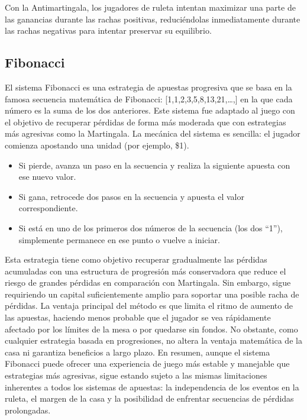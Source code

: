 \documentclass{article}
\begin{document}
Con la Antimartingala, los jugadores de ruleta intentan maximizar una parte de las ganancias durante las rachas positivas, reduciéndolas inmediatamente durante las rachas negativas para intentar preservar su equilibrio.

\subsection{Fibonacci}
El sistema Fibonacci es una estrategia de apuestas progresiva que se basa en la famosa secuencia matemática de Fibonacci: [1,1,2,3,5,8,13,21,…,] en la que cada número es la suma de los dos anteriores. Este sistema fue adaptado al juego con el objetivo de recuperar pérdidas de forma más moderada que con estrategias más agresivas como la Martingala. La mecánica del sistema es sencilla: el jugador comienza apostando una unidad (por ejemplo, \$1).

\begin{itemize}
    \item Si pierde, avanza un paso en la secuencia y realiza la siguiente apuesta con ese nuevo valor.
    \item Si gana, retrocede dos pasos en la secuencia y apuesta el valor correspondiente.
    \item Si está en uno de los primeros dos números de la secuencia (los dos “1”), simplemente permanece en ese punto o vuelve a iniciar.
\end{itemize}

Esta estrategia tiene como objetivo recuperar gradualmente las pérdidas acumuladas con una estructura de progresión más conservadora que reduce el riesgo de grandes pérdidas en comparación con Martingala. Sin embargo, sigue requiriendo un capital suficientemente amplio para soportar una posible racha de pérdidas. La ventaja principal del método es que limita el ritmo de aumento de las apuestas, haciendo menos probable que el jugador se vea rápidamente afectado por los límites de la mesa o por quedarse sin fondos. No obstante, como cualquier estrategia basada en progresiones, no altera la ventaja matemática de la casa ni garantiza beneficios a largo plazo. En resumen, aunque el sistema Fibonacci puede ofrecer una experiencia de juego más estable y manejable que estrategias más agresivas, sigue estando sujeto a las mismas limitaciones inherentes a todos los sistemas de apuestas: la independencia de los eventos en la ruleta, el margen de la casa y la posibilidad de enfrentar secuencias de pérdidas prolongadas.
\end{document}
